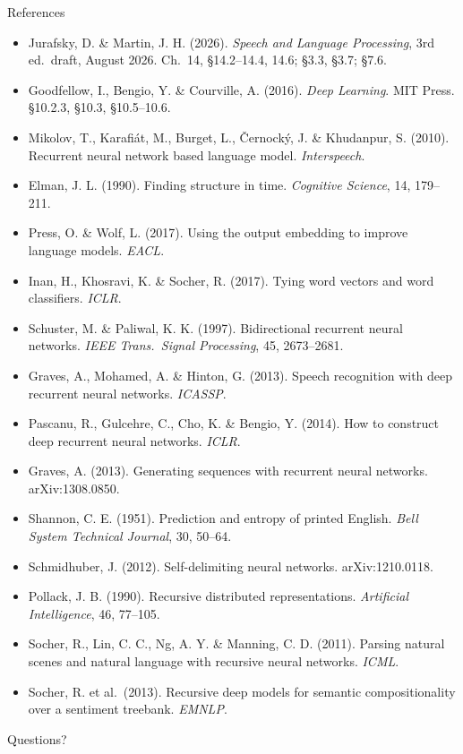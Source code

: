 \documentclass[aspectratio=169, 11pt]{beamer}
\newcommand{\nosrc}{}       %
\begin{document}
\begin{frame}[allowframebreaks]{References}
  \nosrc
  \scriptsize
  \begin{itemize}\itemsep0.3em
    \item Jurafsky, D. \& Martin, J. H. (2026). \emph{Speech and Language
          Processing}, 3rd ed.\ draft, August 2026. Ch.~14, \S14.2--14.4,
          14.6; \S3.3, \S3.7; \S7.6.
    \item Goodfellow, I., Bengio, Y. \& Courville, A. (2016). \emph{Deep
          Learning}. MIT Press. \S10.2.3, \S10.3, \S10.5--10.6.
    \item Mikolov, T., Karafi\'at, M., Burget, L., \v{C}ernock\'y, J. \&
          Khudanpur, S. (2010). Recurrent neural network based language
          model. \emph{Interspeech}.
    \item Elman, J. L. (1990). Finding structure in time. \emph{Cognitive
          Science}, 14, 179--211.
    \item Press, O. \& Wolf, L. (2017). Using the output embedding to
          improve language models. \emph{EACL}.
    \item Inan, H., Khosravi, K. \& Socher, R. (2017). Tying word vectors
          and word classifiers. \emph{ICLR}.
    \item Schuster, M. \& Paliwal, K. K. (1997). Bidirectional recurrent
          neural networks. \emph{IEEE Trans.\ Signal Processing}, 45,
          2673--2681.
    \item Graves, A., Mohamed, A. \& Hinton, G. (2013). Speech recognition
          with deep recurrent neural networks. \emph{ICASSP}.
    \item Pascanu, R., Gulcehre, C., Cho, K. \& Bengio, Y. (2014). How to
          construct deep recurrent neural networks. \emph{ICLR}.
    \item Graves, A. (2013). Generating sequences with recurrent neural
          networks. arXiv:1308.0850.
    \item Shannon, C. E. (1951). Prediction and entropy of printed
          English. \emph{Bell System Technical Journal}, 30, 50--64.
    \item Schmidhuber, J. (2012). Self-delimiting neural networks.
          arXiv:1210.0118.
    \item Pollack, J. B. (1990). Recursive distributed representations.
          \emph{Artificial Intelligence}, 46, 77--105.
    \item Socher, R., Lin, C. C., Ng, A. Y. \& Manning, C. D. (2011).
          Parsing natural scenes and natural language with recursive
          neural networks. \emph{ICML}.
    \item Socher, R. et al.\ (2013). Recursive deep models for semantic
          compositionality over a sentiment treebank. \emph{EMNLP}.
  \end{itemize}
\end{frame}

\begin{frame}[standout]
  \nosrc
  Questions?
\end{frame}
\end{document}

